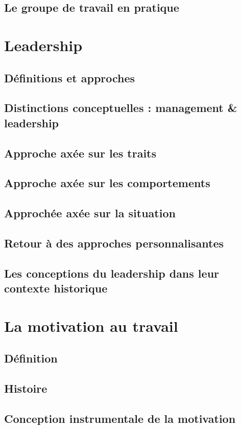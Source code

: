 \documentclass[12pt]{article}
\begin{document}
	\subsection{Le groupe de travail en pratique}
		
\section{Leadership}
	\subsection{Définitions et approches}
	\subsection{Distinctions conceptuelles : management \& leadership}
	\subsection{Approche axée sur les traits}
	\subsection{Approche axée sur les comportements}
	\subsection{Approchée axée sur la situation}
	\subsection{Retour à des approches personnalisantes}
	\subsection{Les conceptions du leadership dans leur contexte historique}

\section{La motivation au travail}
	\subsection{Définition}
	\subsection{Histoire}
	\subsection{Conception instrumentale de la motivation}
\end{document}
